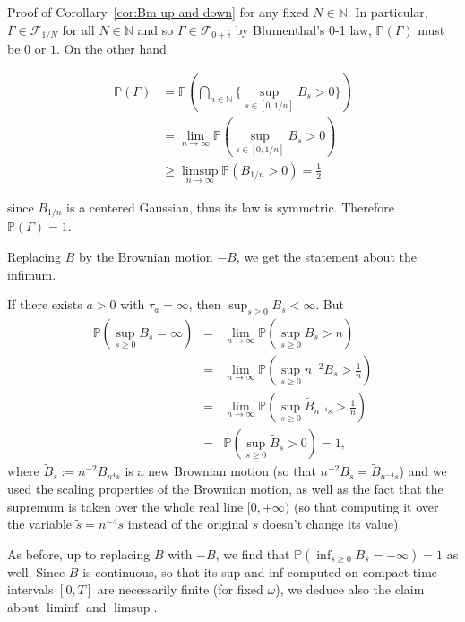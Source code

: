 \documentclass{article}
\newcommand{\coloneq}{:=}
\newcommand{\textbf}[1]{\text{{\bfseries{#1}}}}
\newenvironment{proof*}[1]{\noindent\textbf{#1\ }}{\hspace*{\fill}$\Box$\medskip}
\newcommand{\1}{\1}
\begin{document}
{\begin{proof*}{Proof of Corollary~\ref{cor:Bm up and down}}
  for any fixed $N \in \mathbb{N}$. In particular, $\Gamma \in \mathcal{F}_{1
  / N}$ for all $N \in \mathbb{N}$ and so $\Gamma \in \mathcal{F}_{0 +}$; by
  Blumenthal's 0-1 law, $\mathbb{P} (\Gamma)$ must be $0$ or $1$. On the other
  hand
  
  \begin{align*}
    \mathbb{P} (\Gamma) & =\mathbb{P} \left( \bigcap_{n \in \mathbb{N}} \{
    \sup_{s \in [0, 1 / n]} B_s > 0 \} \right)\\
    & = \lim_{n \rightarrow \infty} \mathbb{P} (\sup_{s \in [0, 1 / n]} B_s >
    0)\\
    & \geqslant \limsup_{n \rightarrow \infty} \mathbb{P} (B_{1 / n} > 0) =
    \frac{1}{2}
  \end{align*}
  
  since $B_{1 / n}$ is a centered Gaussian, thus its law is symmetric.
  Therefore $\mathbb{P} (\Gamma) = 1$.
  
  Replacing $B$ by the Brownian motion $- B$, we get the statement about the
  infimum.
  
  If there exists $a > 0$ with $\tau_a = \infty$, then $\sup_{s \geqslant 0}
  B_s < \infty$. But
  \begin{eqnarray*}
    \mathbb{P} (\sup_{s \geqslant 0} B_s = \infty) & = & \lim_{n \rightarrow
    \infty} \mathbb{P} (\sup_{s \geqslant 0} B_s > n)\\
    & = & \lim_{n \rightarrow \infty} \mathbb{P} \left( \sup_{s \geqslant 0}
    n^{- 2} B_s > \frac{1}{n} \right)\\
    & = & \lim_{n \rightarrow \infty} \mathbb{P} \left( \sup_{s \geqslant 0} 
    \tilde{B}_{n^{- 4} s} > \frac{1}{n} \right)\\
    & = & \mathbb{P} (\sup_{s \geqslant 0} \tilde{B}_s > 0) = 1,
  \end{eqnarray*}
  where $\tilde{B}_s \coloneq n^{- 2} B_{n^4 s}$ is a new Brownian motion (so
  that $n^{- 2} B_s = \tilde{B}_{n^{- 4} s}$) and we used the scaling
  properties of the Brownian motion, as well as the fact that the supremum is
  taken over the whole real line $[0, + \infty)$ (so that computing it over
  the variable $\tilde{s} = n^{- 4} s$ instead of the original $s$ doesn't
  change its value).
  
  As before, up to replacing $B$ with $- B$, we find that $\mathbb{P} (\inf_{s
  \geqslant 0} B_s = - \infty) = 1$ as well. Since $B$ is continuous, so that
  its sup and inf computed on compact time intervals $[0, T]$ are necessarily
  finite (for fixed $\omega$), we deduce also the claim about $\liminf$ and
  $\limsup$.
\end{proof*}

}
\end{document}
